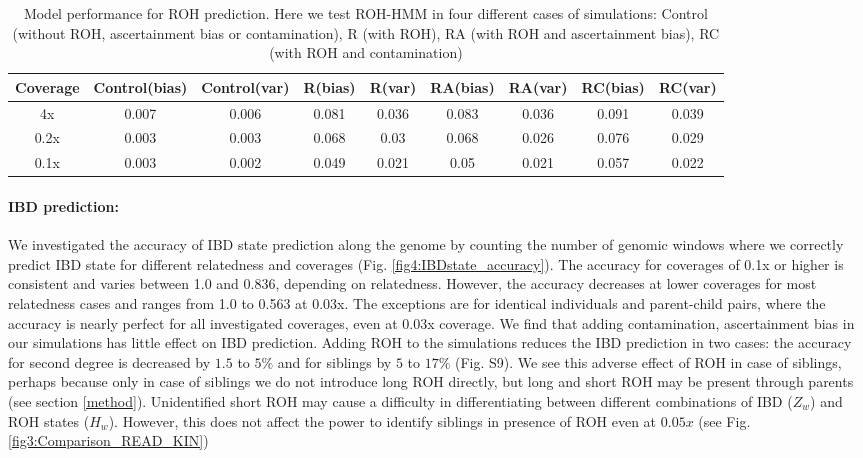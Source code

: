 \documentclass[12pt, letterpaper]{article}
\begin{document}
\begin{table}[h!]
\caption{\label{tab:Table 2}Model performance for ROH prediction. Here we test ROH-HMM in four different cases of simulations: Control (without ROH, ascertainment bias or contamination), R (with ROH), RA (with ROH and ascertainment bias), RC (with ROH and contamination)}
\begin{tabular}{|c|c|c|c|c|c|c|c|c|}
    \hline
    Coverage & Control(bias) & Control(var) & R(bias) & R(var) & RA(bias) & RA(var) & RC(bias) & RC(var)\\
    \hline
    4x & 0.007 & 0.006 & 0.081 & 0.036 & 0.083 & 0.036 & 0.091 & 0.039\\
    \hline
    0.2x & 0.003 & 0.003 & 0.068 & 0.03 & 0.068 & 0.026 & 0.076 & 0.029\\
    \hline
    0.1x & 0.003 & 0.002 & 0.049 & 0.021 & 0.05 & 0.021 & 0.057 & 0.022\\
    \hline
\end{tabular}
\label{table1}
\end{table}


\paragraph{IBD prediction:}
We investigated the accuracy of IBD state prediction along the genome by counting the number of genomic windows where we correctly predict IBD state for different relatedness and coverages (Fig. \ref{fig4:IBDstate_accuracy}). The accuracy for coverages of 0.1x or higher is consistent and varies between 1.0 and 0.836, depending on relatedness. However, the accuracy decreases at lower coverages for most relatedness cases and ranges from 1.0 to 0.563 at 0.03x. The exceptions are for identical individuals and parent-child pairs, where the accuracy is nearly perfect for all investigated coverages, even at 0.03x coverage. We find that adding contamination, ascertainment bias in our simulations has little effect on IBD prediction. Adding ROH to the simulations reduces the IBD prediction in two cases: the accuracy for second degree is decreased by $1.5$ to $5\%$ and for siblings by $5$ to $17\%$ (Fig. S9). We see this adverse effect of ROH in case of siblings, perhaps because only in case of siblings we do not introduce long ROH directly, but long and short ROH may be present through parents (see section \ref{method}). Unidentified short ROH may cause a difficulty in differentiating between different combinations of IBD ($Z_w$) and ROH states ($H_w$). However, this does not affect the power to identify siblings in presence of ROH even at $0.05x$ (see Fig. \ref{fig3:Comparison_READ_KIN})
\end{document}

